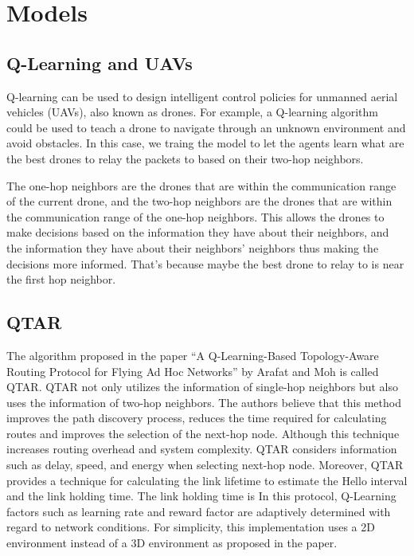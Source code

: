 \section{Models}

\subsection{Q-Learning and UAVs}
Q-learning can be used to design intelligent control policies for unmanned aerial vehicles (UAVs), also known as drones.
For example, a Q-learning algorithm could be used to teach a drone to navigate through an unknown environment and avoid obstacles.
In this case, we traing the model to let the agents learn what are the best drones to relay the packets to based on their two-hop neighbors.

The one-hop neighbors are the drones that are within the communication range of the current drone, and the two-hop neighbors are the
drones that are within the communication range of the one-hop neighbors. This allows the drones to make decisions based on the information
they have about their neighbors, and the information they have about their neighbors' neighbors thus making the decisions more informed.
That's because maybe the best drone to relay to is near the first hop neighbor.

\subsection{QTAR}
The algorithm proposed in the paper ``A Q-Learning-Based Topology-Aware Routing Protocol for Flying Ad Hoc Networks'' by Arafat and Moh is called QTAR.
QTAR not only utilizes the information of single-hop neighbors
but also uses the information of two-hop neighbors.
The authors believe that this method improves the path discovery process,
reduces the time required for calculating routes and improves the selection of the next-hop node.
Although this technique increases routing overhead and system complexity.
QTAR considers information such as delay, speed, and energy when selecting next-hop node. Moreover, QTAR provides a technique for calculating 
the link lifetime to estimate the Hello interval and the link holding time. The link holding time is 
In this protocol, Q-Learning factors such as learning rate and reward factor are 
adaptively determined with regard to network conditions.
For simplicity, this implementation uses a 2D environment instead of a 3D environment as proposed in the paper.
